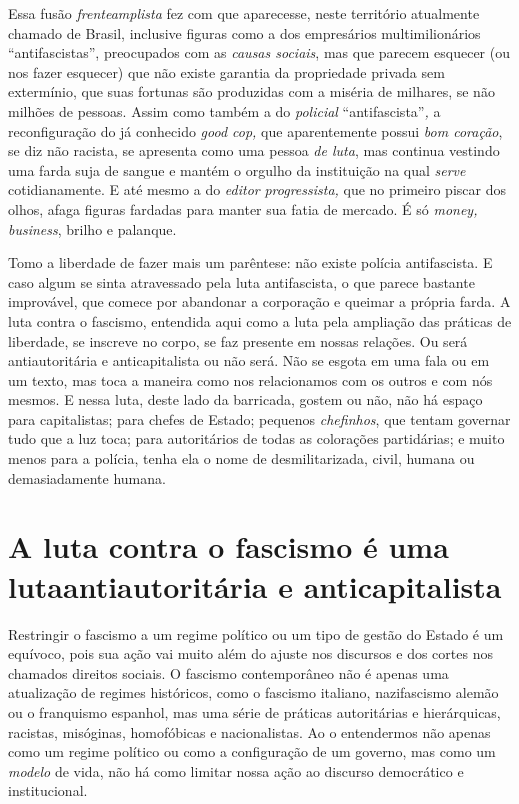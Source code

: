Essa fusão \emph{frenteamplista} fez com que aparecesse, neste
território atualmente chamado de Brasil, inclusive figuras como a dos
empresários multimilionários ``antifascistas'', preocupados com as
\emph{causas sociais}, mas que parecem esquecer (ou nos fazer esquecer)
que não existe garantia da propriedade privada sem extermínio, que suas
fortunas são produzidas com a miséria de milhares, se não milhões de
pessoas. Assim como também a do \emph{policial} ``antifascista''\emph{,}
a reconfiguração do já conhecido \emph{good cop,} que aparentemente
possui \emph{bom coração}, se diz não racista, se apresenta como uma
pessoa \emph{de luta}, mas continua vestindo uma farda suja de sangue e
mantém o orgulho da instituição na qual \emph{serve} cotidianamente. E
até mesmo a do \emph{editor} \emph{progressista,} que no primeiro piscar
dos olhos, afaga figuras fardadas para manter sua fatia de mercado. É só
\emph{money, business}, brilho e palanque.

Tomo a liberdade de fazer mais um parêntese: não existe polícia
antifascista. E caso algum se sinta atravessado pela luta antifascista,
o que parece bastante improvável, que comece por abandonar a corporação
e queimar a própria farda. A luta contra o fascismo, entendida aqui como
a luta pela ampliação das práticas de liberdade, se inscreve no corpo,
se faz presente em nossas relações. Ou será antiautoritária e
anticapitalista ou não será. Não se esgota em uma fala ou em um texto,
mas toca a maneira como nos relacionamos com os outros e com nós mesmos.
E nessa luta, deste lado da barricada, gostem ou não, não há espaço para
capitalistas; para chefes de Estado; pequenos \emph{chefinhos}, que
tentam governar tudo que a luz toca; para autoritários de todas as
colorações partidárias; e muito menos para a polícia, tenha ela o nome
de desmilitarizada, civil, humana ou demasiadamente humana.

\section{A luta contra o fascismo é uma luta\break antiautoritária e anticapitalista}

Restringir o fascismo a um regime político ou um tipo de gestão do
Estado é um equívoco, pois sua ação vai muito além do ajuste nos
discursos e dos cortes nos chamados direitos sociais. O fascismo
contemporâneo não é apenas uma atualização de regimes históricos, como o
fascismo italiano, nazifascismo alemão ou o franquismo espanhol, mas uma
série de práticas autoritárias e hierárquicas, racistas, misóginas,
homofóbicas e nacionalistas. Ao o entendermos não apenas como um regime
político ou como a configuração de um governo, mas como um \emph{modelo}
de vida, não há como limitar nossa ação ao discurso democrático e
institucional.

